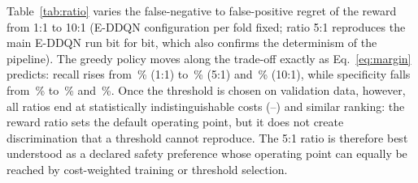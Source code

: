 Table~\ref{tab:ratio} varies the false-negative to false-positive regret of the reward from 1:1 to 10:1 (E-DDQN configuration per fold fixed; ratio 5:1 reproduces the main E-DDQN run bit for bit, which also confirms the determinism of the pipeline). The greedy policy moves along the trade-off exactly as Eq.~\eqref{eq:margin} predicts: recall rises from \RatioArgOneRecall\,\% (1:1) to \RatioArgFiveRecall\,\% (5:1) and \RatioArgOneZeroRecall\,\% (10:1), while specificity falls from \RatioArgOneSpec\,\% to \RatioArgFiveSpec\,\% and \RatioArgOneZeroSpec\,\%. Once the threshold is chosen on validation data, however, all ratios end at statistically indistinguishable costs (\RatioTunedOneCost--\RatioTunedOneZeroCost) and similar ranking: the reward ratio sets the default operating point, but it does not create discrimination that a threshold cannot reproduce. The 5:1 ratio is therefore best understood as a declared safety preference whose operating point can equally be reached by cost-weighted training or threshold selection.

\begin{table}[t]
\centering
\caption{Reward-ratio sensitivity of E-DDQN: operating point of the greedy (arg-max) policy, whose implied cut-off on $P(y=1\mid s)$ is $1/(1+R)$, and of the validation-tuned threshold (rule D1). Mean ($\pm$ SD) over five seeds.}
\label{tab:ratio}
\footnotesize

\end{table}
